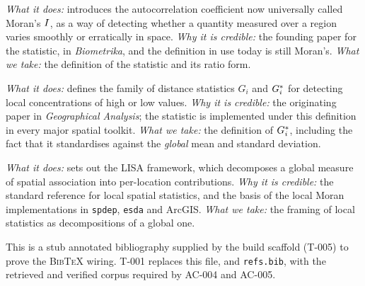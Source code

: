 \begin{description}\setlength{\itemsep}{0.6em}

\item[\citet{moran1950}] \emph{What it does:} introduces the autocorrelation
  coefficient now universally called Moran's $I$, as a way of detecting
  whether a quantity measured over a region varies smoothly or erratically in
  space. \emph{Why it is credible:} the founding paper for the statistic, in
  \emph{Biometrika}, and the definition in use today is still Moran's.
  \emph{What we take:} the definition of the statistic and its ratio form.

\item[\citet{getisord1992}] \emph{What it does:} defines the family of distance
  statistics $G_i$ and $G_i^{*}$ for detecting local concentrations of high or
  low values. \emph{Why it is credible:} the originating paper in
  \emph{Geographical Analysis}; the statistic is implemented under this
  definition in every major spatial toolkit. \emph{What we take:} the definition
  of $G_i^{*}$, including the fact that it standardises against the
  \emph{global} mean and standard deviation.

\item[\citet{anselin1995}] \emph{What it does:} sets out the LISA framework,
  which decomposes a global measure of spatial association into per-location
  contributions. \emph{Why it is credible:} the standard reference for local
  spatial statistics, and the basis of the local Moran implementations in
  \texttt{spdep}, \texttt{esda} and ArcGIS. \emph{What we take:} the framing of
  local statistics as decompositions of a global one.

\end{description}

\begin{keyinsight}[Placeholder]
This is a stub annotated bibliography supplied by the build scaffold (T-005) to
prove the \textsc{BibTeX} wiring. T-001 replaces this file, and
\texttt{refs.bib}, with the retrieved and verified corpus required by AC-004 and
AC-005.
\end{keyinsight}
